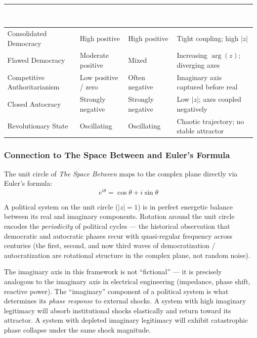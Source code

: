 \documentclass[11pt,letterpaper]{article}
\newcommand{\tableheader}[1]{\textbf{\sffamily\textcolor{white}{#1}}}
\begin{document}
\begin{center}
\begin{tabularx}{\textwidth}{L{3cm}L{2.5cm}L{2.5cm}X}
\toprule
{}
\tableheader{Attractor} & \tableheader{Real Axis} & \tableheader{Imaginary Axis} & \tableheader{Distinguishing Dynamics} \\
\midrule
Consolidated Democracy & High positive & High positive & Tight coupling; high $|z|$ \\
Flawed Democracy & Moderate positive & Mixed & Increasing $\arg(z)$; diverging axes \\
Competitive Authoritarianism & Low positive / zero & Often negative & Imaginary axis captured before real \\
Closed Autocracy & Strongly negative & Strongly negative & Low $|z|$; axes coupled negatively \\
Revolutionary State & Oscillating & Oscillating & Chaotic trajectory; no stable attractor \\
\bottomrule
\end{tabularx}
\end{center}

\subsubsection{Connection to The Space Between and Euler's Formula}

The unit circle of \textit{The Space Between} maps to the complex plane directly via Euler's formula:
\[
  e^{i\theta} = \cos\theta + i\sin\theta
\]

A political system on the unit circle ($|z| = 1$) is in perfect energetic balance between its real and imaginary components. Rotation around the unit circle encodes the \textit{periodicity} of political cycles --- the historical observation that democratic and autocratic phases recur with quasi-regular frequency across centuries (the first, second, and now third waves of democratization / autocratization are rotational structure in the complex plane, not random noise).

The imaginary axis in this framework is not ``fictional'' --- it is precisely analogous to the imaginary axis in electrical engineering (impedance, phase shift, reactive power). The ``imaginary'' component of a political system is what determines its \textit{phase response} to external shocks. A system with high imaginary legitimacy will absorb institutional shocks elastically and return toward its attractor. A system with depleted imaginary legitimacy will exhibit catastrophic phase collapse under the same shock magnitude.
\end{document}
